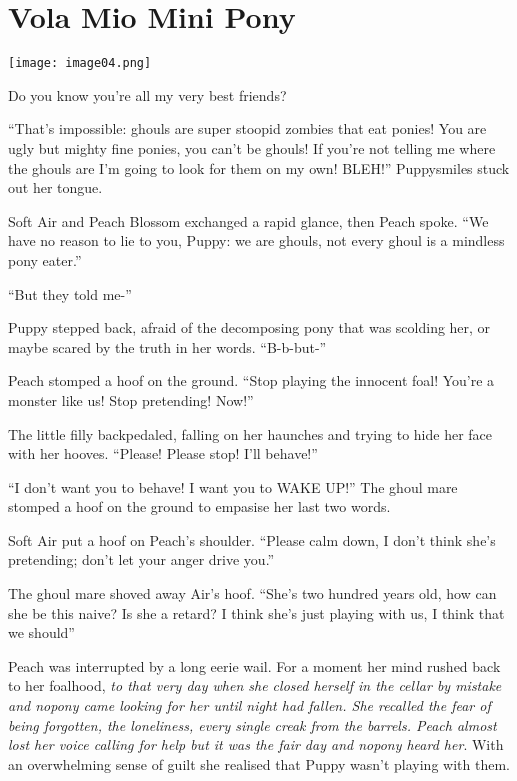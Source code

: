 \chapter{Vola Mio Mini Pony}

\texttt{[image: image04.png]}

\begin{intro}
    Do you know you're all my very best friends?
\end{intro}


``That's impossible: ghouls are super stoopid zombies that eat ponies! You are ugly but mighty fine ponies, you can't be ghouls! If you're not telling me where the ghouls are I'm going to look for them on my own! BLEH!'' Puppysmiles stuck out her tongue.

Soft Air and Peach Blossom exchanged a rapid glance, then Peach spoke. ``We have no reason to lie to you, Puppy: we are ghouls, not every ghoul is a mindless pony eater.''

``But they told me-''


Puppy stepped back, afraid of the decomposing pony that was scolding her, or maybe scared by the truth in her words. ``B-b-but-''

Peach stomped a hoof on the ground. ``Stop playing the innocent foal! You're a monster like us! Stop pretending! Now!''

The little filly backpedaled, falling on her haunches and trying to hide her face with her hooves. ``Please! Please stop! I'll behave!''

``I don't want you to behave! I want you to WAKE UP!'' The ghoul mare stomped a hoof on the ground to empasise her last two words.

Soft Air put a hoof on Peach's shoulder. ``Please calm down, I don't think she's pretending; don't let your anger drive you.''

The ghoul mare shoved away Air's hoof. ``She's two hundred years old, how can she be this naive? Is she a retard? I think she's just playing with us, I think that we should''

Peach was interrupted by a long eerie wail. For a moment her mind rushed back to her foalhood, \emph{to that very day when she closed herself in the cellar by mistake and nopony came looking for her until night had fallen. She recalled the fear of being forgotten, the loneliness, every single creak from the barrels. Peach almost lost her voice calling for help but it was the fair day and nopony heard her}. With an overwhelming sense of guilt she realised that Puppy wasn't playing with them.

